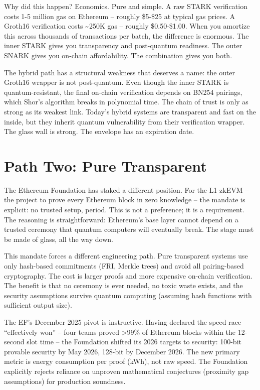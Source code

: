 \documentclass[
  11pt,
  openany]{report}
\begin{document}
Why did this happen? Economics. Pure and simple. A raw STARK verification costs
1-5 million gas on Ethereum -- roughly \$5-\$25 at typical gas prices. A Groth16
verification costs \textasciitilde250K gas -- roughly \$0.50-\$1.00. When you
amortize this across thousands of transactions per batch, the difference is
enormous. The inner STARK gives you transparency and post-quantum readiness. The
outer SNARK gives you on-chain affordability. The combination gives you both.

The hybrid path has a structural weakness that deserves a name: the outer
Groth16 wrapper is not post-quantum. Even though the inner STARK is
quantum-resistant, the final on-chain verification depends on BN254 pairings,
which Shor's algorithm breaks in polynomial time. The chain of trust is only as
strong as its weakest link. Today's hybrid systems are transparent and fast on
the inside, but they inherit quantum vulnerability from their verification
wrapper. The glass wall is strong. The envelope has an expiration date.

\section{Path Two: Pure Transparent}\label{path-two-pure-transparent}

The Ethereum Foundation has staked a different position. For the L1 zkEVM -- the
project to prove every Ethereum block in zero knowledge -- the mandate is
explicit: no trusted setup, period. This is not a preference; it is a
requirement. The reasoning is straightforward: Ethereum's base layer cannot
depend on a trusted ceremony that quantum computers will eventually break. The
stage must be made of glass, all the way down.

This mandate forces a different engineering path. Pure transparent systems use
only hash-based commitments (FRI, Merkle trees) and avoid all pairing-based
cryptography. The cost is larger proofs and more expensive on-chain
verification. The benefit is that no ceremony is ever needed, no toxic waste
exists, and the security assumptions survive quantum computing (assuming hash
functions with sufficient output size).

The EF's December 2025 pivot is instructive. Having declared the speed race
``effectively won'' -- four teams proved \textgreater99\% of Ethereum blocks
within the 12-second slot time -- the Foundation shifted its 2026 targets to
security: 100-bit provable security by May 2026, 128-bit by December 2026. The
new primary metric is energy consumption per proof (kWh), not raw speed. The
Foundation explicitly rejects reliance on unproven mathematical conjectures
(proximity gap assumptions) for production soundness.
\end{document}
